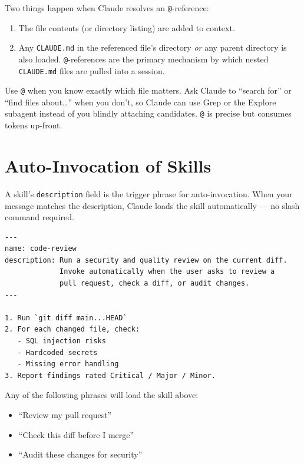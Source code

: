Two things happen when Claude resolves an \texttt{@}-reference:

\begin{enumerate}
  \item The file contents (or directory listing) are added to context.
  \item Any \texttt{CLAUDE.md} in the referenced file's directory \emph{or}
        any parent directory is also loaded. \texttt{@}-references are the
        primary mechanism by which nested \texttt{CLAUDE.md} files are
        pulled into a session.
\end{enumerate}

\begin{notebox}
Use \texttt{@} when you know exactly which file matters. Ask Claude to
``search for'' or ``find files about\ldots'' when you don't, so Claude
can use Grep or the Explore subagent instead of you blindly attaching
candidates. \texttt{@} is precise but consumes tokens up-front.
\end{notebox}

\section{Auto-Invocation of Skills}
\label{sec:auto-invocation}


A skill's \texttt{description} field is the trigger phrase for
auto-invocation. When your message matches the description, Claude loads
the skill automatically — no slash command required.

\begin{lstlisting}[caption={A skill that auto-invokes on PR-review language}]
---
name: code-review
description: Run a security and quality review on the current diff.
             Invoke automatically when the user asks to review a
             pull request, check a diff, or audit changes.
---

1. Run `git diff main...HEAD`
2. For each changed file, check:
   - SQL injection risks
   - Hardcoded secrets
   - Missing error handling
3. Report findings rated Critical / Major / Minor.
\end{lstlisting}

Any of the following phrases will load the skill above:

\begin{itemize}
  \item ``Review my pull request''
  \item ``Check this diff before I merge''
  \item ``Audit these changes for security''
\end{itemize}

